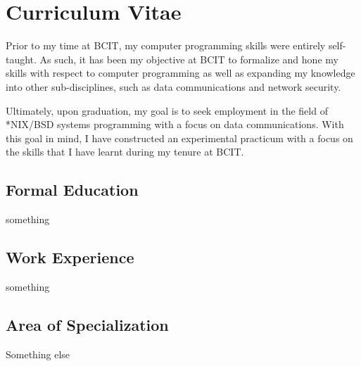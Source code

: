 \chapter{Curriculum Vitae}
\label{chp:Curriculum Vitae}

Prior to my time at BCIT, my computer programming skills were entirely self-taught. As such, it has been my objective at BCIT to formalize and hone my skills with respect to computer programming as well as expanding my knowledge into other sub-disciplines, such as data communications and network security.

Ultimately, upon graduation, my goal is to seek employment in the field of *NIX/BSD systems programming with a focus on data communications. With this goal in mind, I have constructed an experimental practicum with a focus on the skills that I have learnt during my tenure at BCIT.

\section{Formal Education}

something

\section{Work Experience}

something

\section{Area of Specialization}

Something else